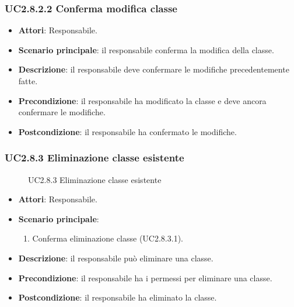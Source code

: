 \subsubsection{UC2.8.2.2 Conferma modifica classe}
\begin{itemize}
\item \textbf{Attori}: Responsabile.
\item \textbf{Scenario principale}: il responsabile conferma la modifica della classe.
\item \textbf{Descrizione}: il responsabile deve confermare le modifiche precedentemente fatte.
\item \textbf{Precondizione}: il responsabile ha modificato la classe e deve ancora confermare le modifiche.
\item \textbf{Postcondizione}: il responsabile ha confermato le modifiche.
\end{itemize}
\subsubsection{UC2.8.3 Eliminazione classe esistente}
\begin{figure}[H]
\centering
\noindent{}
\caption{UC2.8.3 Eliminazione classe esistente}
\end{figure}
\begin{itemize}
\item \textbf{Attori}: Responsabile.
\item \textbf{Scenario principale}:
\begin{enumerate}
\item Conferma eliminazione classe (UC2.8.3.1).
\end{enumerate}
\item \textbf{Descrizione}: il responsabile può eliminare una classe.
\item \textbf{Precondizione}: il responsabile ha i permessi per eliminare una classe.
\item \textbf{Postcondizione}: il responsabile ha eliminato la classe.
\end{itemize}
